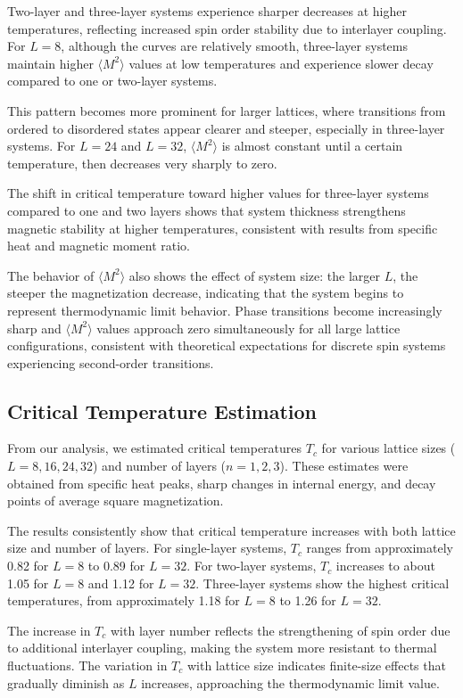 \documentclass[conference, compsoc, twoside]{IEEEtran}
\begin{document}
Two-layer and three-layer systems experience sharper decreases at higher temperatures, reflecting increased spin order stability due to interlayer coupling. For $L = 8$, although the curves are relatively smooth, three-layer systems maintain higher $\langle M^2 \rangle$ values at low temperatures and experience slower decay compared to one or two-layer systems.

This pattern becomes more prominent for larger lattices, where transitions from ordered to disordered states appear clearer and steeper, especially in three-layer systems. For $L = 24$ and $L = 32$, $\langle M^2 \rangle$ is almost constant until a certain temperature, then decreases very sharply to zero.

The shift in critical temperature toward higher values for three-layer systems compared to one and two layers shows that system thickness strengthens magnetic stability at higher temperatures, consistent with results from specific heat and magnetic moment ratio.

The behavior of $\langle M^2 \rangle$ also shows the effect of system size: the larger $L$, the steeper the magnetization decrease, indicating that the system begins to represent thermodynamic limit behavior. Phase transitions become increasingly sharp and $\langle M^2 \rangle$ values approach zero simultaneously for all large lattice configurations, consistent with theoretical expectations for discrete spin systems experiencing second-order transitions.

\subsection{Critical Temperature Estimation}

From our analysis, we estimated critical temperatures $T_c$ for various lattice sizes ($L = 8, 16, 24, 32$) and number of layers ($n = 1, 2, 3$). These estimates were obtained from specific heat peaks, sharp changes in internal energy, and decay points of average square magnetization.

The results consistently show that critical temperature increases with both lattice size and number of layers. For single-layer systems, $T_c$ ranges from approximately 0.82 for $L = 8$ to 0.89 for $L = 32$. For two-layer systems, $T_c$ increases to about 1.05 for $L = 8$ and 1.12 for $L = 32$. Three-layer systems show the highest critical temperatures, from approximately 1.18 for $L = 8$ to 1.26 for $L = 32$.

The increase in $T_c$ with layer number reflects the strengthening of spin order due to additional interlayer coupling, making the system more resistant to thermal fluctuations. The variation in $T_c$ with lattice size indicates finite-size effects that gradually diminish as $L$ increases, approaching the thermodynamic limit value.
\end{document}
